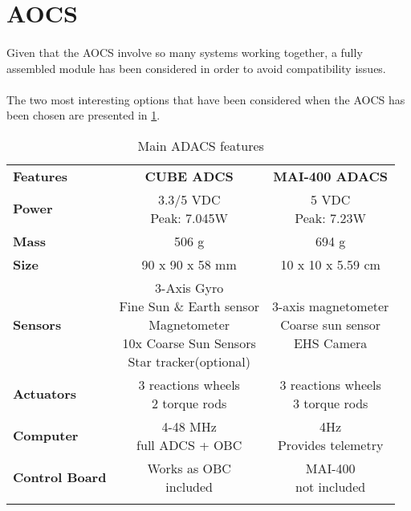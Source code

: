 \section{AOCS} \label{Appendix:AOCS}

\paragraph{}Given that the AOCS involve so many systems working together, a fully assembled module has been considered in order to avoid compatibility issues. 

\paragraph{}The two most interesting options that have been considered when the AOCS has been chosen are presented in \ref{ADACS}.

\begin{longtable}{| l | c | c |}
	
	\hline
	\rowcolor[gray]{0.60} \multicolumn{3}{|c|}{\textbf{ADACS options }} \\
	\hline
	
	\hline
	\rowcolor[gray]{0.75}	\textbf{Features} &  \textbf{CUBE ADCS} & \textbf{MAI-400 ADACS} \\
	\hline
	
	\cellcolor[gray]{0.85} \textbf{Power} &\makecell{3.3/5 VDC\\ Peak: 7.045W }&  \makecell{5 VDC\\Peak: 7.23W}  \\ 	\hline
	\cellcolor[gray]{0.85} \textbf{Mass} & 506 g& 694 g\\ \hline
	\cellcolor[gray]{0.85} \textbf{Size} & 90 x 90 x 58 mm&10 x 10 x 5.59 cm \\ \hline
	\cellcolor[gray]{0.85} \textbf{Sensors} & \makecell{3-Axis Gyro\\Fine Sun \& Earth sensor \\ Magnetometer\\10x Coarse Sun Sensors \\Star tracker(optional)}& \makecell{3-axis magnetometer \\Coarse sun sensor\\EHS Camera}\\ 	\hline
	\cellcolor[gray]{0.85} \textbf{Actuators} &  \makecell{3 reactions wheels\\2 torque rods} & \makecell{3 reactions wheels\\3 torque rods}\\ 	\hline
	\cellcolor[gray]{0.85} \textbf{Computer} &\makecell{4-48 MHz\\ full ADCS + OBC}  & \makecell{4Hz\\Provides telemetry}\\ \hline
	\cellcolor[gray]{0.85} \textbf{Control Board} & \makecell{Works as OBC\\included}& \makecell{MAI-400\\ not included}\\
	\hline
	
	\caption{Main ADACS features}
	\label{ADACS}
	
\end{longtable}

